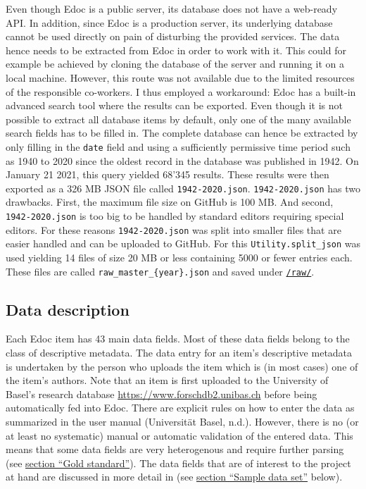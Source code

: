 Even though Edoc is a public server, its database does not have a
web-ready API. In addition, since Edoc is a production server, its
underlying database cannot be used directly on pain of disturbing the
provided services. The data hence needs to be extracted from Edoc in
order to work with it. This could for example be achieved by cloning the
database of the server and running it on a local machine. However, this
route was not available due to the limited resources of the responsible
co-workers. I thus employed a workaround: Edoc has a built-in advanced
search tool where the results can be exported. Even though it is not
possible to extract all database items by default, only one of the many
available search fields has to be filled in. The complete database can
hence be extracted by only filling in the \texttt{date} field and using
a sufficiently permissive time period such as 1940 to 2020 since the
oldest record in the database was published in 1942. On January 21 2021,
this query yielded 68'345 results. These results were then exported as a
326 MB JSON file called \texttt{1942-2020.json}. \texttt{1942-2020.json}
has two drawbacks. First, the maximum file size on GitHub is 100 MB. And
second, \texttt{1942-2020.json} is too big to be handled by standard
editors requiring special editors. For these reasons
\texttt{1942-2020.json} was split into smaller files that are easier
handled and can be uploaded to GitHub. For this
\texttt{Utility.split\_json} was used yielding 14 files of size 20 MB or
less containing 5000 or fewer entries each. These files are called
\texttt{raw\_master\_\{year\}.json} and saved under
\href{https://github.com/MHindermann/mas/tree/main/files/raw}{\texttt{/raw/}}.

\hypertarget{data-description}{%
\subsection{Data description}\label{data-description}}

Each Edoc item has 43 main data fields. Most of these data fields belong
to the class of descriptive metadata. The data entry for an item's
descriptive metadata is undertaken by the person who uploads the item
which is (in most cases) one of the item's authors. Note that an item is
first uploaded to the University of Basel's research database
\url{https://www.forschdb2.unibas.ch} before being automatically fed
into Edoc. There are explicit rules on how to enter the data as
summarized in the user manual (Universität Basel, n.d.). However, there
is no (or at least no systematic) manual or automatic validation of the
entered data. This means that some data fields are very heterogenous and
require further parsing (see \protect\hyperlink{gold-standard}{section
``Gold standard''}). The data fields that are of interest to the project
at hand are discussed in more detail in (see
\protect\hyperlink{sample-data-set}{section ``Sample data set''} below).

